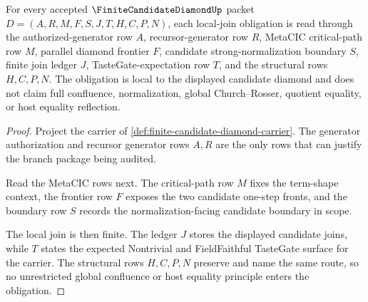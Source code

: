 \begin{theorem}
\label{thm:finite-candidate-diamond-local-join-obligation}
For every accepted $\FiniteCandidateDiamondUp$ packet $D=(A,R,M,F,S,J,T,H,C,P,N)$, each local-join obligation is read through the authorized-generator row $A$, recursor-generator row $R$, MetaCIC critical-path row $M$, parallel diamond frontier $F$, candidate strong-normalization boundary $S$, finite join ledger $J$, TasteGate-expectation row $T$, and the structural rows $H,C,P,N$. The obligation is local to the displayed candidate diamond and does not claim full confluence, normalization, global Church--Rosser, quotient equality, or host equality reflection.
\end{theorem}
\begin{proof}
Project the carrier of \autoref{def:finite-candidate-diamond-carrier}. The generator authorization and recursor generator rows $A,R$ are the only rows that can justify the branch package being audited.

Read the MetaCIC rows next. The critical-path row $M$ fixes the term-shape context, the frontier row $F$ exposes the two candidate one-step fronts, and the boundary row $S$ records the normalization-facing candidate boundary in scope.

The local join is then finite. The ledger $J$ stores the displayed candidate joins, while $T$ states the expected Nontrivial and FieldFaithful TasteGate surface for the carrier. The structural rows $H,C,P,N$ preserve and name the same route, so no unrestricted global confluence or host equality principle enters the obligation.
\end{proof}

